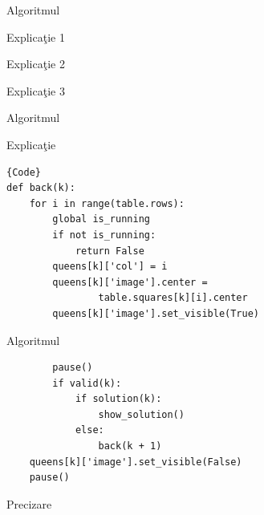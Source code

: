 \documentclass{beamer}
\begin{document}
\begin{frame}{Algoritmul}
    \begin{block}{Explica\c tie 1}
        \lipsum[1][1]
    \end{block}

    \begin{block}{Explica\c tie 2}
        \lipsum[1][1-2]
    \end{block}

    \begin{block}{Explica\c tie 3}
        \lipsum[2][1-3]
    \end{block}
\end{frame}

\begin{frame}[fragile]{Algoritmul}
    \begin{block}{Explica\c tie}
        \lipsum[1][1-2]
    \end{block}

    \begin{lstlisting}{Code}
def back(k):
    for i in range(table.rows):
        global is_running
        if not is_running:
            return False
        queens[k]['col'] = i
        queens[k]['image'].center = 
                table.squares[k][i].center
        queens[k]['image'].set_visible(True)

    \end{lstlisting}
\end{frame}

\begin{frame}[fragile]{Algoritmul}
    \begin{lstlisting}
        pause()
        if valid(k):
            if solution(k):
                show_solution()
            else:
                back(k + 1)
    queens[k]['image'].set_visible(False)
    pause()
    \end{lstlisting}

    \begin{block}{Precizare}
        \lipsum[1][3-5]
    \end{block}
\end{frame}
\end{document}
